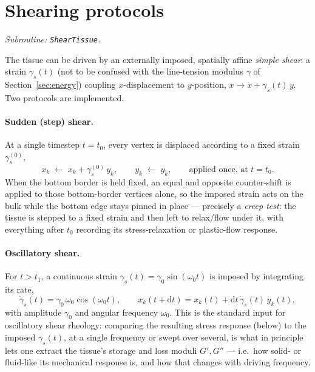 \documentclass[11pt]{article}
\newcommand{\ord}{\mathrm{d}}
\begin{document}
\section{Shearing protocols}
\label{sec:shear}

\textit{Subroutine: \texttt{ShearTissue}.}

The tissue can be driven by an externally imposed, spatially affine \emph{simple
shear}: a strain $\gamma_s(t)$ (not to be confused with the line-tension modulus
$\gamma$ of Section~\ref{sec:energy}) coupling $x$-displacement to $y$-position,
$x \to x + \gamma_s(t)\, y$. Two protocols are implemented.

\paragraph{Sudden (step) shear.} At a single timestep $t = t_0$, every vertex is
displaced according to a fixed strain $\gamma_s^{(0)}$,
\begin{equation}
  x_k \;\longleftarrow\; x_k + \gamma_s^{(0)}\, y_k, \qquad
  y_k \;\longleftarrow\; y_k, \qquad \text{applied once, at } t=t_0.
  \label{eq:sudden-shear}
\end{equation}
When the bottom border is held fixed, an equal and opposite counter-shift is applied to
those bottom-border vertices alone, so the imposed strain acts on the bulk while the
bottom edge stays pinned in place --- precisely a \emph{creep test}: the tissue is
stepped to a fixed strain and then left to relax/flow under it, with everything after
$t_0$ recording its stress-relaxation or plastic-flow response.

\paragraph{Oscillatory shear.} For $t>t_1$, a continuous strain
$\gamma_s(t) = \gamma_0 \sin(\omega_0 t)$ is imposed by integrating its rate,
\begin{equation}
  \dot\gamma_s(t) = \gamma_0\,\omega_0\cos(\omega_0 t), \qquad
  x_k(t+\ord t) = x_k(t) + \ord t\,\dot\gamma_s(t)\,y_k(t),
  \label{eq:osc-shear}
\end{equation}
with amplitude $\gamma_0$ and angular frequency $\omega_0$. This is the standard input
for oscillatory shear rheology: comparing the resulting stress response (below) to the
imposed $\gamma_s(t)$, at a single frequency or swept over several, is what in principle
lets one extract the tissue's storage and loss moduli $G',G''$ --- i.e.\ how solid- or
fluid-like its mechanical response is, and how that changes with driving frequency.
\end{document}
